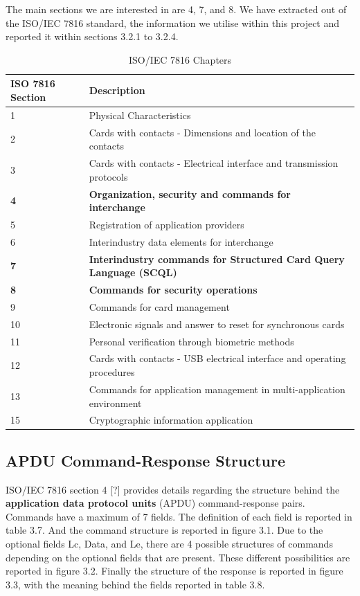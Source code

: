 \documentclass[bsc,frontabs,twoside,singlespacing,parskip,deptreport]{infthesis}     %
\begin{document}
The main sections we are interested in are 4, 7, and 8. We have extracted out of the ISO/IEC 7816 standard, the information we utilise within this project and reported it within sections 3.2.1 to 3.2.4.

\begin{table}[H]
\begin{tabular}{|l|p{12cm}|}
\hline
ISO 7816 Section & Description\\
\hline
1 & Physical Characteristics \\
\hline
2 & Cards with contacts - Dimensions and location of the contacts \\
\hline
3 & Cards with contacts - Electrical interface and transmission protocols \\
\hline
\textbf{4}  & \textbf{Organization, security and commands for interchange} \\
\hline
5 & Registration of application providers \\
\hline
6 & Interindustry data elements for interchange \\
\hline
\textbf{7} & \textbf{Interindustry commands for Structured Card Query Language (SCQL)} \\
\hline
\textbf{8} & \textbf{Commands for security operations} \\
\hline
9 & Commands for card management \\
\hline
10 & Electronic signals and answer to reset for synchronous cards \\
\hline
11 & Personal verification through biometric methods \\
\hline
12 & Cards with contacts - USB electrical interface and operating procedures \\
\hline
13 & Commands for application management in multi-application environment \\
\hline
15 & Cryptographic information application \\
\hline
\end{tabular}
\caption{ISO/IEC 7816 Chapters}
\end{table}


\subsection{APDU Command-Response Structure}

ISO/IEC 7816 section 4 [?] provides details regarding the structure behind the \textbf{application data protocol units} (APDU) command-response pairs. Commands have a maximum of 7 fields. The definition of each field is reported in table 3.7.  And the command structure is reported in figure 3.1. Due to the optional fields Lc, Data, and Le, there are 4 possible structures of commands depending on the optional fields that are present. These different possibilities are reported in figure 3.2. Finally the structure of the response is reported in figure 3.3, with the meaning behind the fields reported in table 3.8.
\end{document}
